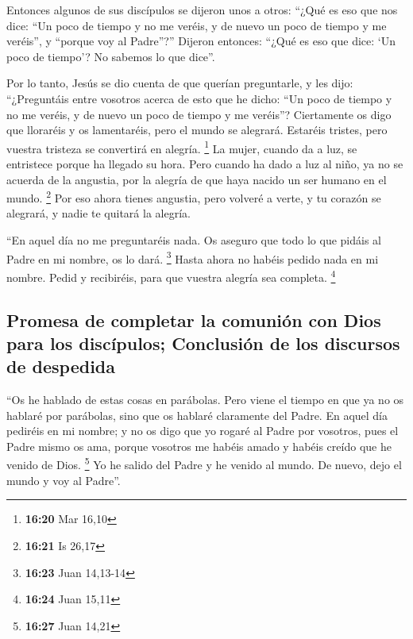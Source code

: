  Entonces algunos de sus discípulos se dijeron unos a
otros: ``¿Qué es eso que nos dice: ``Un poco de tiempo y no me veréis, y
de nuevo un poco de tiempo y me veréis'', y ``porque voy al Padre''?''
 Dijeron entonces: ``¿Qué es eso que dice: `Un poco de
tiempo'? No sabemos lo que dice''.

 Por lo tanto, Jesús se dio cuenta de que querían
preguntarle, y les dijo: ``¿Preguntáis entre vosotros acerca de esto que
he dicho: ``Un poco de tiempo y no me veréis, y de nuevo un poco de
tiempo y me veréis''?  Ciertamente os digo que lloraréis
y os lamentaréis, pero el mundo se alegrará. Estaréis tristes, pero
vuestra tristeza se convertirá en alegría. \footnote{\textbf{16:20} Mar
  16,10}  La mujer, cuando da a luz, se entristece porque
ha llegado su hora. Pero cuando ha dado a luz al niño, ya no se acuerda
de la angustia, por la alegría de que haya nacido un ser humano en el
mundo. \footnote{\textbf{16:21} Is 26,17}  Por eso ahora
tienes angustia, pero volveré a verte, y tu corazón se alegrará, y nadie
te quitará la alegría.

 ``En aquel día no me preguntaréis nada. Os aseguro que
todo lo que pidáis al Padre en mi nombre, os lo dará. \footnote{\textbf{16:23}
  Juan 14,13-14}  Hasta ahora no habéis pedido nada en mi
nombre. Pedid y recibiréis, para que vuestra alegría sea completa.
\footnote{\textbf{16:24} Juan 15,11}

\hypertarget{promesa-de-completar-la-comuniuxf3n-con-dios-para-los-discuxedpulos-conclusiuxf3n-de-los-discursos-de-despedida}{%
\subsection{Promesa de completar la comunión con Dios para los
discípulos; Conclusión de los discursos de
despedida}\label{promesa-de-completar-la-comuniuxf3n-con-dios-para-los-discuxedpulos-conclusiuxf3n-de-los-discursos-de-despedida}}

 ``Os he hablado de estas cosas en parábolas. Pero viene
el tiempo en que ya no os hablaré por parábolas, sino que os hablaré
claramente del Padre.  En aquel día pediréis en mi
nombre; y no os digo que yo rogaré al Padre por vosotros,
 pues el Padre mismo os ama, porque vosotros me habéis
amado y habéis creído que he venido de Dios. \footnote{\textbf{16:27}
  Juan 14,21}  Yo he salido del Padre y he venido al
mundo. De nuevo, dejo el mundo y voy al Padre''.

